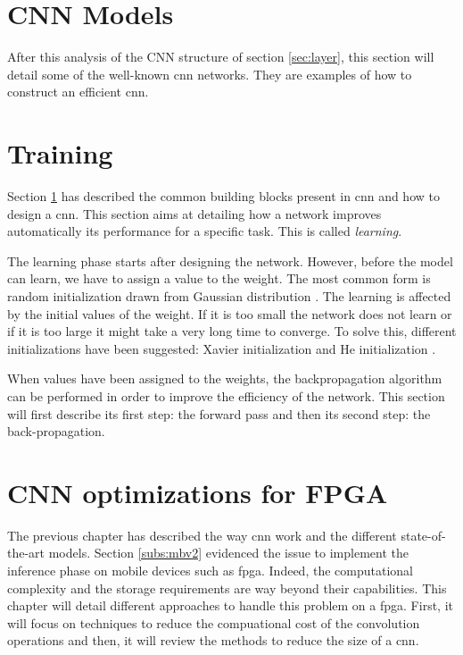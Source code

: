 \section{CNN Models} \label{sec:models}
After this analysis of the CNN structure of section \ref{sec:layer}, this section will detail some of the well-known \acrshort{cnn} networks. They are examples of how to construct an efficient \acrshort{cnn}.

%

%
%
\section{Training} \label{sec:train}
Section \ref{sec:models} has described the common building blocks present in \acrshort{cnn} and how to design a \acrshort{cnn}. This section aims at detailing how a network improves automatically its performance for a specific task. This is called \textit{learning}.

The learning phase starts after designing the network. However, before the model can learn, we have to assign a value to the weight. The most common form is random initialization drawn from Gaussian distribution \cite{he_delving_2015}. The learning is affected by the initial values of the weight. If it is too small the network does not learn or if it is too large it might take a very long time to converge. To solve this, different initializations have been suggested: Xavier initialization \cite{glorot_understanding_2010} and He initialization \cite{he_delving_2015}.

When values have been assigned to the weights, the backpropagation algorithm can be performed in order to improve the efficiency of the network. This section will first describe its first step: the forward pass and then its second step: the back-propagation.
%

%

%
%
\section{CNN optimizations for FPGA} \label{sec:opti_cnn}
%
%
The previous chapter has described the way \acrshort{cnn} work and the different state-of-the-art models. Section \ref{subs:mbv2} evidenced the issue to implement the inference phase on mobile devices such as \acrshort{fpga}. Indeed, the computational complexity and the storage requirements are way beyond their capabilities. This chapter will detail different approaches to handle this problem on a \acrshort{fpga}. First, it will focus on techniques to reduce the compuational cost of the convolution operations and then, it will review the methods to reduce the size of a \acrshort{cnn}.
%

%



